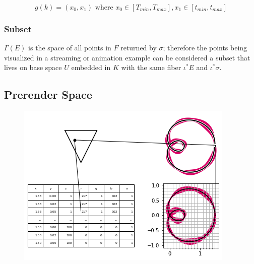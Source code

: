\documentclass[../main.tex]{subfiles}
\begin{document}
\begin{equation}
g(k) = (x_0, x_1) \text{ where } x_0 \in [T_{min}, T_{max}], x_1 \in [t_{min}, t_{max}]
\end{equation}






\subsubsection{Subset}
$\Gamma(E)$ is the space of all points in $F$ returned by $\sigma$; therefore the points being visualized in a streaming or animation example can be considered a subset that lives on base space $U$ embedded in $K$ with the same fiber $\iota^*E$ and $\iota^*\sigma$.   


\subsection{Prerender Space}
\label{sec:display}

\begin{figure}[h]
    \includegraphics[width=.4\linewidth]{figures/sections/math/render.png}
    \caption{}
    \label{fig:render}
\end{figure}
\end{document}
